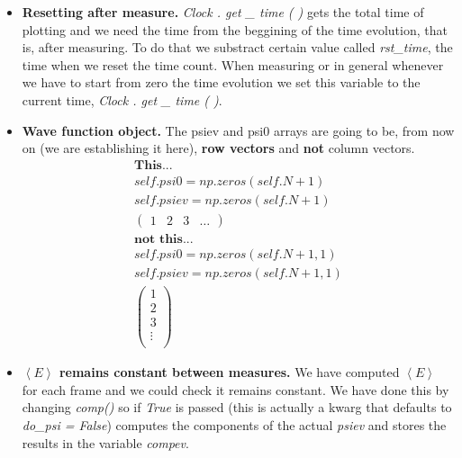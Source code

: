 \documentclass{article}
\begin{document}
\begin{itemize}
	\item \textbf{Resetting after measure.} \textit{Clock . get \_ time ( )} gets the total time of plotting and we need the time from the beggining of the time evolution, that is, after measuring. To do that we substract certain value called \textit{rst\_time}, the time when we reset the time count. When measuring or in general whenever we have to start from zero the time evolution we set this variable to the current time, \textit{Clock . get \_ time ( )}.
	
	\item \textbf{Wave function object.} The psiev and psi0 arrays are going to be, from now on (we are establishing it here), \textbf{row vectors} and \textbf{not} column vectors.
	\[
	\begin{gathered}
	\textbf{This...}\\
	self.psi0 = np.zeros(self.N + 1)\\
	self.psiev = np.zeros(self.N + 1)\\
	\begin{pmatrix}
	1 & 2 & 3 & \dots
	\end{pmatrix}\\
	\textbf{not\  this...}\\
	self.psi0 = np.zeros(self.N + 1, 1)\\
	self.psiev = np.zeros(self.N + 1, 1)\\
	\begin{pmatrix}
	1\\
	2\\
	3\\
	\vdots\\
	\end{pmatrix}
	\end{gathered}
	\]
	
	\item \textbf{ $\left\langle E \right\rangle$ remains constant between measures.} We have computed  $\left\langle E \right\rangle$ for each frame and we could check it remains constant. We have done this by changing \textit{comp()} so if  \textit{True} is passed (this is actually a kwarg that defaults to \textit{do\_psi = False}) computes the components of the actual \textit{psiev} and stores the results in the variable \textit{compev}.

\end{itemize}
\end{document}
